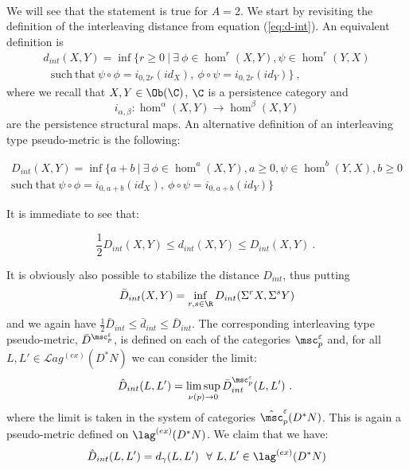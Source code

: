  \
 
 We will see that the statement is true for $A=2$. We start by revisiting the definition of the interleaving distance from equation 
 (\ref{eq:d-int}). An equivalent definition is 
 \begin{equation*} \label{eq:d-int2}
  \begin{aligned}
d_{int}(X,Y)=\inf\{r\geq 0 \ | \ \exists\ \phi\in\hom^{r}(X,Y), \psi\in \hom^{r}(Y,X) \\  \     \mathrm{\ \ such\ that}\ \psi\circ \phi =i_{0,2r}(id_{X}), \  \phi \circ \psi = i_{0,2r}(id_{Y})\} \ , 
\end{aligned}
\end{equation*}
 where we recall that
 $X,Y\in \Ob(\C)$, $\C$ is a persistence category
 and $$i_{\alpha,\beta}: \hom^{\alpha}(X,Y)\to \hom^{\beta}(X,Y)$$ are the persistence structural maps. An alternative definition
of an interleaving type pseudo-metric is the following:
 
 \begin{equation} \label{eq:d-int3}
  \begin{aligned}
D_{int}(X,Y)=\inf\{a+b \ | \ \exists\ \phi\in\hom^{a}(X,Y), a \geq 0, \psi\in \hom^{b}(Y,X), b\geq 0 \\     \mathrm{such\ that}\ \psi\circ \phi =i_{0,a+b}(id_{X}), \  \phi \circ \psi = i_{0,a+b}(id_{Y})\}
\end{aligned}
\end{equation} 

It is immediate to see that:

\begin{equation}\label{eq:ineq_var_inter}
\frac{1}{2} D_{int}(X,Y)\leq d_{int}(X,Y)\leq D_{int}(X,Y)~.~
\end{equation}

It is obviously also possible to stabilize the distance $D_{int}$, thus putting
\begin{equation*}\label{eq:sdint2}
\bar{D}_{int} (X,Y)=\inf_{r,s\in \R} D_{int} (\Sigma^{r}X,\Sigma^{s}Y)
\end{equation*}
and we again have $\frac{1}{2} \bar{D}_{int} \leq \bar{d}_{int}\leq    \bar{D}_{int}$.
The corresponding interleaving type pseudo-metric, $\bar{D}^{\msc_{p}^{\varepsilon}}$, is defined on each of the  categories $\msc_{p}^{\varepsilon}$ and, for all $L,L'\in\mathcal{L}ag^{(ex)}(D^{\ast}N)$ we can consider the limit:
 $$\hat{D}_{int}(L,L')=\limsup_{\nu(p)\to 0} \bar{D}_{int}^{\msc_{p}^{\varepsilon}}(L,L')~.~$$
 where the limit is taken in the system of categories $\hat{\msc}_{p}^{\varepsilon}(D^{\ast}N)$. This is again a pseudo-metric defined on
 $\lag^{(ex)}(D^{\ast}N)$. We claim that we have:
 \begin{equation}\label{eq:equality_int}
 \hat{D}_{int}(L,L')= d_{\gamma}(L,L') \ \ \forall \ L,L'\in \lag^{(ex)}(D^{\ast}N)
 \end{equation}
 
